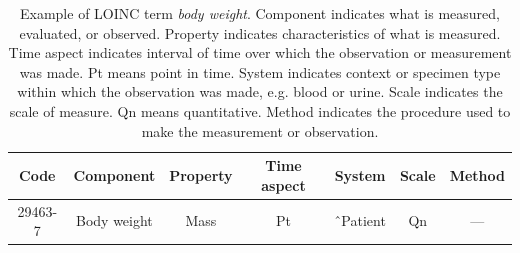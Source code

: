 \begin{table}[ht]
\centering

\begin{tabular}{|c|c|c|c|c|c|c|}
\hline
\textbf{Code} & 
\textbf{Component} & 
\textbf{Property} & 
\textbf{Time aspect}&
\textbf{System}&
\textbf{Scale}&
\textbf{Method}\\ \hline
29463-7 & 
Body weight & 
Mass & 
Pt &
\^\ Patient &
Qn &
---
\\ \hline
\end{tabular}
\caption{Example of LOINC term \textit{body weight}. Component indicates what is measured, evaluated, or observed. Property indicates characteristics of what is measured. Time aspect indicates interval of time over which the observation or measurement was made. Pt means point in time. System indicates context or specimen type within which the observation was made, e.g. blood or urine. Scale indicates the scale of measure. Qn means quantitative. Method indicates the procedure used to make the measurement or observation.
}
\label{tab:Example of clinical LOINC terms and names }
\end{table}










